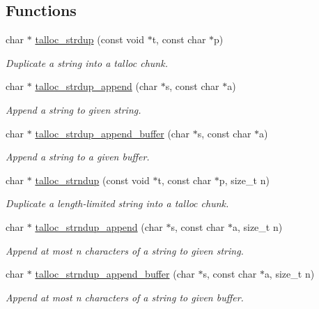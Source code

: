 \subsection*{Functions}
\begin{DoxyCompactItemize}
\item 
char $\ast$ \hyperlink{group__talloc__string_gaca866b920e3b876b00946027244cdd8f}{talloc\+\_\+strdup} (const void $\ast$t, const char $\ast$p)
\begin{DoxyCompactList}\small\item\em Duplicate a string into a talloc chunk. \end{DoxyCompactList}\item 
char $\ast$ \hyperlink{group__talloc__string_ga27ce7e41cadde877157b1456f629ca3d}{talloc\+\_\+strdup\+\_\+append} (char $\ast$s, const char $\ast$a)
\begin{DoxyCompactList}\small\item\em Append a string to given string. \end{DoxyCompactList}\item 
char $\ast$ \hyperlink{group__talloc__string_ga2b2413835aa49f303755f03fcdbf71ff}{talloc\+\_\+strdup\+\_\+append\+\_\+buffer} (char $\ast$s, const char $\ast$a)
\begin{DoxyCompactList}\small\item\em Append a string to a given buffer. \end{DoxyCompactList}\item 
char $\ast$ \hyperlink{group__talloc__string_gade5e000346fc18848e33a8a2dd4c38ef}{talloc\+\_\+strndup} (const void $\ast$t, const char $\ast$p, size\+\_\+t n)
\begin{DoxyCompactList}\small\item\em Duplicate a length-\/limited string into a talloc chunk. \end{DoxyCompactList}\item 
char $\ast$ \hyperlink{group__talloc__string_gafc991e1f5959bd60999492c9bd3bf173}{talloc\+\_\+strndup\+\_\+append} (char $\ast$s, const char $\ast$a, size\+\_\+t n)
\begin{DoxyCompactList}\small\item\em Append at most n characters of a string to given string. \end{DoxyCompactList}\item 
char $\ast$ \hyperlink{group__talloc__string_ga33df1e6b76551e55e57891dd76d0cca9}{talloc\+\_\+strndup\+\_\+append\+\_\+buffer} (char $\ast$s, const char $\ast$a, size\+\_\+t n)
\begin{DoxyCompactList}\small\item\em Append at most n characters of a string to given buffer. \end{DoxyCompactList}\item 

\end{DoxyCompactItemize}
